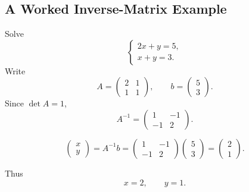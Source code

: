 \subsection{A Worked Inverse-Matrix Example}

Solve
\[
\begin{cases}
2x+y=5,\\
x+y=3.
\end{cases}
\]
Write
\[
A=\begin{pmatrix}2&1\\1&1\end{pmatrix},
\qquad
b=\begin{pmatrix}5\\3\end{pmatrix}.
\]
Since $\det A=1$,
\[
A^{-1}=\begin{pmatrix}1&-1\\-1&2\end{pmatrix}.
\]

\begin{derivationbox}
\[
\begin{pmatrix}x\\y\end{pmatrix}
=A^{-1}b
=\begin{pmatrix}1&-1\\-1&2\end{pmatrix}
\begin{pmatrix}5\\3\end{pmatrix}
=\begin{pmatrix}2\\1\end{pmatrix}.
\]
\end{derivationbox}

Thus
\[
\boxed{x=2,\qquad y=1}.
\]
